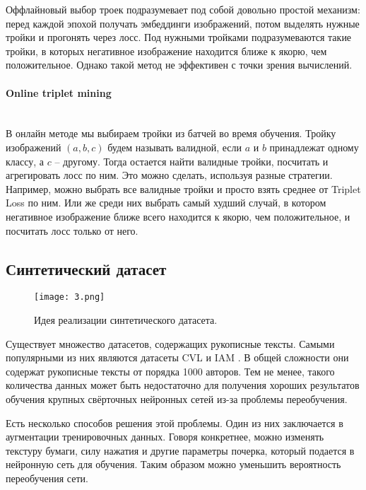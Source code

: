 Оффлайновый выбор троек подразумевает под собой довольно простой механизм: перед каждой эпохой получать эмбеддинги изображений, потом выделять нужные тройки и прогонять через лосс. Под нужными тройками подразумеваются такие тройки, в которых негативное изображение находится ближе к якорю, чем положительное. Однако такой метод не эффективен с точки зрения вычислений.

\paragraph{Online triplet mining}\mbox{} \\

В онлайн методе мы выбираем тройки из батчей во время обучения. Тройку изображений $(a, b, c)$ будем называть валидной, если $a$ и $b$ принадлежат одному классу, а $c$ -- другому. Тогда остается найти валидные тройки, посчитать и агрегировать лосс по ним. Это можно сделать, используя разные стратегии. Например, можно выбрать все валидные тройки и просто взять среднее от Triplet Loss по ним. Или же среди них выбрать самый худший случай, в котором негативное изображение ближе всего находится к якорю, чем положительное, и посчитать лосс только от него.

\subsection{Синтетический датасет}

\begin{figure}[htbp]
    \centering
    \texttt{[image: 3.png]}
    \caption{Идея реализации синтетического датасета.}
    \label{fig:synthetic}
\end{figure}

Существует множество датасетов, содержащих рукописные тексты. Самыми популярными из них являются датасеты CVL \cite{cvl} и IAM \cite{iam}. В общей сложности они содержат рукописные тексты от порядка 1000 авторов. Тем не менее, такого количества данных может быть недостаточно для получения хороших результатов обучения крупных свёрточных нейронных сетей из-за проблемы переобучения. 

Есть несколько способов решения этой проблемы. Один из них заключается в аугментации тренировочных данных. Говоря конкретнее, можно изменять текстуру бумаги, силу нажатия и другие параметры почерка, который подается в нейронную сеть для обучения. Таким образом можно уменьшить вероятность переобучения сети.

